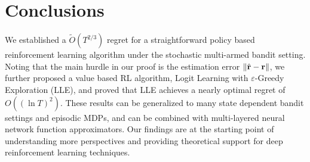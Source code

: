 \section{Conclusions}
\label{sec:conclusions}
We established a $\tilde{O}(T^{2/3})$ regret for a straightforward policy based reinforcement learning algorithm under the stochastic multi-armed bandit setting. 
Noting that the main hurdle in our proof is the estimation error $\|\hat{{\mathbf{r}}} - {\mathbf{r}}\|$, we further proposed a value based RL algorithm, Logit Learning with $\varepsilon$-Greedy Exploration (LLE),
and proved that LLE achieves a nearly optimal regret of $O((\ln T)^2)$.
These results can be generalized to many state dependent bandit settings and episodic MDPs, and can be combined with multi-layered neural network function approximators. Our findings are at the starting point of understanding more perspectives and providing theoretical support for deep reinforcement learning techniques. %
